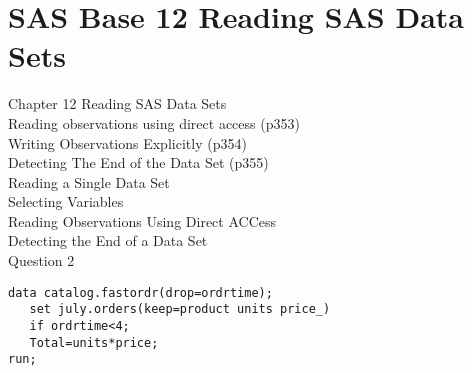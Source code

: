 \section{SAS Base 12 Reading SAS Data Sets}

Chapter 12 Reading SAS Data Sets\\
Reading observations using direct access (p353)\\
Writing Observations Explicitly (p354)\\
Detecting The End of the Data Set (p355)\\
Reading a Single Data Set\\
Selecting Variables\\
Reading Observations Using Direct ACCess\\
Detecting the End of a Data Set\\

Question 2
\begin{framed}
\begin{verbatim}
data catalog.fastordr(drop=ordrtime);
   set july.orders(keep=product units price_)
   if ordrtime<4;
   Total=units*price;
run;
\end{verbatim}
\end{framed}



